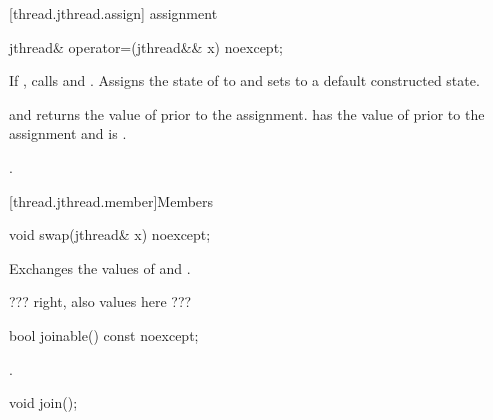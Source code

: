 [thread.jthread.assign]{ assignment}

%
\begin{itemdecl}
jthread& operator=(jthread&& x) noexcept;
\end{itemdecl}

\begin{itemdescr}
\pnum
\effects If , calls  and .
Assigns the
state of  to  and sets  to a default constructed state.

{\color{diffcolor}
\pnum
\postconditions {} and  returns the value of
 prior to the assignment.
 has the value of  prior to the assignment
and  is .
}%

\pnum
\returns {}.
\end{itemdescr}


[thread.jthread.member]{Members}

%
\begin{itemdecl}
void swap(jthread& x) noexcept;
\end{itemdecl}

\begin{itemdescr}
\pnum
\effects Exchanges the values of  and .
\end{itemdescr}

??? right, also values here ???

%
\begin{itemdecl}
bool joinable() const noexcept;
\end{itemdecl}

\begin{itemdescr}
\pnum
\returns {}.
\end{itemdescr}

%
\begin{itemdecl}
void join();
\end{itemdecl}

